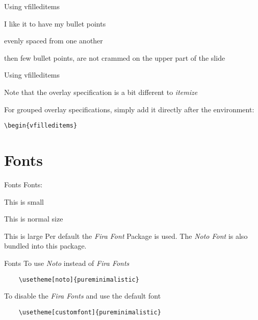 \documentclass[aspectratio=169]{beamer}
\begin{document}
\begin{frame}{Using vfilleditems}
    \begin{vfilleditems}
        \item I like it to have my bullet points
        \item evenly spaced from one another
        \item then few bullet points, are not crammed on
        the upper part of the slide
    \end{vfilleditems}
\end{frame}

\begin{frame}{Using vfilleditems}
    \begin{vfilleditems}
        \item Note that the overlay specification
        is a bit different to \emph{itemize}
        \item For grouped overlay specifications, simply add it
        directly after the environment:
        \begin{vfilleditems}
            \item \texttt{\textbackslash{}begin\{vfilleditems\}<+->}
        \end{vfilleditems}
    \end{vfilleditems}
\end{frame}


\section{Fonts}
\begin{frame}[fragile]{Fonts}
    Fonts:

    {\small This is small}

    This is normal size

        {\large This is large}
    \vfill
    Per default the \emph{Fira Font} Package is
    used. The \emph{Noto Font} is also bundled into this
    package.
\end{frame}

\begin{frame}[fragile]{Fonts}
    To use \emph{Noto} instead of \emph{Fira Fonts}
    \begin{verbatim}
    \usetheme[noto]{pureminimalistic}
  \end{verbatim}
    \vfill
    To disable the \emph{Fira Fonts} and use the default font
    \begin{verbatim}
    \usetheme[customfont]{pureminimalistic}
  \end{verbatim}
\end{frame}
\end{document}
